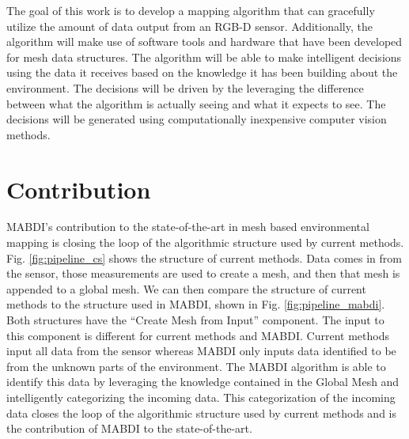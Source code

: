 The goal of this work is to develop a mapping algorithm that can gracefully
utilize the amount of data output from an RGB-D sensor. Additionally, the
algorithm will make use of software tools and hardware that have been developed
for mesh data structures. The algorithm will be able to make intelligent
decisions using the data it receives based on the knowledge it has been building
about the environment. The decisions will be driven by the leveraging the
difference between what the algorithm is actually seeing and what it expects to
see. The decisions will be generated using computationally inexpensive computer
vision methods.

\section{Contribution}

MABDI's contribution to the state-of-the-art in mesh based environmental mapping
is closing the loop of the algorithmic structure used by current methods. Fig.
\ref{fig:pipeline_cs} shows the structure of current methods. Data comes in from
the sensor, those measurements are used to create a mesh, and then that mesh is
appended to a global mesh. We can then compare the structure of current methods
to the structure used in MABDI, shown in Fig. \ref{fig:pipeline_mabdi}. Both
structures have the ``Create Mesh from Input'' component. The input to this
component is different for current methods and MABDI. Current methods input all
data from the sensor whereas MABDI only inputs data identified to be from the
unknown parts of the environment. The MABDI algorithm is able to identify this
data by leveraging the knowledge contained in the Global Mesh and intelligently
categorizing the incoming data. This categorization of the incoming data closes
the loop of the algorithmic structure used by current methods and is the
contribution of MABDI to the state-of-the-art.


%
%


